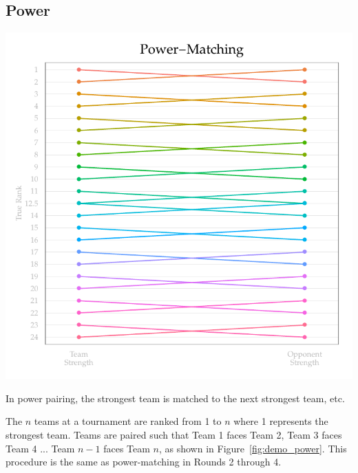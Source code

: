\documentclass{tufte-handout}
\begin{document}
\subsection{Power}
\begin{marginfigure}[-8\baselineskip]%
  \includegraphics[width=\linewidth]{power-matching_demo.pdf}
  \caption{In power pairing, the strongest team is matched to the next strongest team, etc.}
  \label{fig:demo_power}
\end{marginfigure}

The $n$ teams at a tournament are ranked from 1 to $n$ where 1 represents the strongest team. Teams are paired such that Team 1 faces Team 2, Team 3 faces Team 4 ... Team $n-1$ faces Team $n$, as shown in Figure~\ref{fig:demo_power}. This procedure is the same as power-matching in Rounds 2 through 4.
\end{document}
